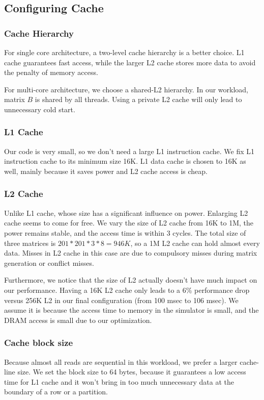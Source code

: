 \documentclass[twocolumn,letterpaper,10pt]{article}
\begin{document}
\subsection{Configuring Cache}

\subsubsection{Cache Hierarchy}
For single core architecture, a two-level cache hierarchy is a better
choice. L1 cache guarantees fast access, while the larger L2 cache stores
more data to avoid the penalty of memory access.

For multi-core architecture, we choose a shared-L2 hierarchy. 
In our workload, matrix $B$ is shared by all
threads. Using a private L2 cache will only lead to unnecessary cold
start.  

\subsubsection{L1 Cache}
Our code is very small, so we don't need a large L1 instruction
cache. We fix L1 instruction cache to its minimum size 16K. L1 data
cache is chosen to 16K as well, mainly because it saves power and L2
cache access is cheap.

\subsubsection{L2 Cache}
Unlike L1 cache, whose size has a significant influence on
power. Enlarging L2 cache seems to come for free. We vary the size of
L2 cache from 16K to 1M, the power remains stable, and the access
time is within 3 cycles. The total size of three matrices is $201 *
201 * 3 * 8 = 946K$, so a 1M L2 cache can hold almost every
data. Misses in L2 cache in this case are due to compulsory misses during matrix generation or conflict
misses.

Furthermore, we notice that the size of L2 actually doesn't have much
impact on our performance. Having a 16K L2 cache only leads to a
6\% performance drop versus 256K L2 in our final configuration (from
100 msec to 106 msec). We assume it is because the
access time to memory in the simulator is small, and the DRAM access
is small due to our optimization.

\subsubsection{Cache block size}
Because almost all reads are sequential in this workload, we prefer a larger cache-line size. We set the block size to 64
bytes, because it guarantees a low access time for L1 cache and it won't
bring in too much unnecessary data at the boundary of a row or a partition.
\end{document}
